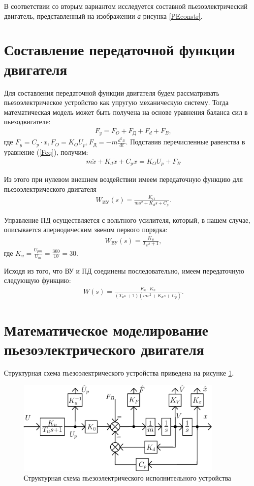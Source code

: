 \documentclass[fleqn, a4paper, 11pt, russian]{article}
\begin{document}
	В соответствии со вторым вариантом исследуется составной пьезоэлектрический двигатель, представленный на изображении \textit{а} рисунка \ref{PEconstr}.
	\clearpage
	{\centering
		\section{Составление передаточной функции двигателя}
	}
	Для составления передаточной функции двигателя будем рассматривать пьезоэлектрическое устройство как упругую механическую систему. Тогда математическая модель может быть получена на основе уравнения баланса сил в пьезодвигателе:
	\begin{align}
		&&F_y = F_O + F_\text{Д} + F_d + F_B,
		\label{Feq}
	\end{align}
	где $F_y = C_p\cdot x, F_O = K_OU_p, F_\text{Д} = -m\displaystyle{\frac{d^2x}{d t}}$. Подставив перечисленные равенства в уравнение (\ref{Feq}), получим:
	\begin{align}
		&&m\ddot{x} + K_d\dot{x} + C_px = K_OU_p + F_B
	\end{align}
	
	Из этого при нулевом внешнем воздействии имеем передаточную функцию для пьезоэлектрического двигателя
	\begin{align} \label{Wpz}
		&&W_\text{ИУ}(s) = \displaystyle{\frac{K_O}{ms^2 + K_ds + C_p}}.
	\end{align}
	
	Управление ПД осуществляется с вольтного усилителя, который, в нашем случае, описывается апериодическим звеном первого порядка:
	\begin{align}
		&&W_\text{ВУ}(s) = \frac{K_u}{T_us + 1},
	\end{align}
	где $K_u = \displaystyle{\frac{U_{pm}}{U_m}} = \frac{300}{10} = 30.$
	
	Исходя из того, что ВУ и ПД соединены последовательно, имеем передаточную следующую функцию:
	\begin{align}
		&&W(s) = \frac{K_0\cdot K_u}{(T_us + 1)(ms^2 + K_ds + C_p)}.
	\end{align}
	\clearpage
	{\centering
		\section{Математическое моделирование пьезоэлектрического двигателя}
	}
	Структурная схема пьезоэлектрического устройства приведена на рисунке \ref{StrScheme}.
	\begin{figure}[ht!]
		\centering
		\includegraphics[width = 0.9\textwidth]{Model/structScheme}
		\caption{Структурная схема пьезоэлектрического исполнительного устройства}
		\label{StrScheme}
	\end{figure}
	
\end{document}
